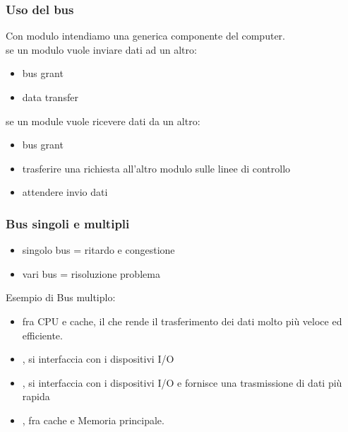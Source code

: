 \documentclass[12pt, a4paper]{article}
\begin{document}
\subsubsection{Uso del bus}
Con modulo intendiamo una generica componente del computer.\\
se un modulo vuole inviare dati ad un altro:
\begin{itemize}
	\item bus grant
	\item data transfer
\end{itemize}
se un module vuole ricevere dati da un altro:
\begin{itemize}
	\item bus grant
	\item trasferire una richiesta all'altro modulo sulle linee di controllo 
	\item attendere invio dati
\end{itemize}


\subsubsection{Bus singoli e multipli}
\begin{itemize}
	\item singolo bus = ritardo e congestione
	\item vari bus = risoluzione problema
\end{itemize}
Esempio di Bus multiplo:

\begin{itemize}
	\item {} fra CPU e cache, il che rende
	il trasferimento dei dati molto più veloce ed efficiente.\\
	\item {},	si interfaccia con i dispositivi I/O
	\item {}, si interfaccia con i dispositivi I/O
		e fornisce una trasmissione di dati più rapida 
	\item {}, fra cache e Memoria principale.
\end{itemize}
\end{document}

